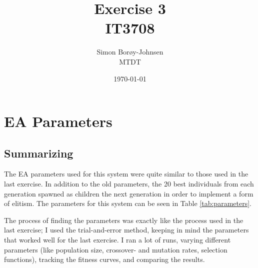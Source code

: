 \documentclass[
]{article}
\begin{document}
\title{\textbf{Exercise 3} \\ IT3708}
\author{Simon Borøy-Johnsen \\ MTDT}
\date{\today}
\maketitle


\section{EA Parameters}
\subsection{Summarizing}
The EA parameters used for this system were quite similar to those used in the last exercise. In addition to the old parameters, the 20 best individuals from each generation spawned as children the next generation in order to implement a form of elitism. The parameters for this system can be seen in Table \ref{tab:parameters}.

The process of finding the parameters was exactly like the process used in the last exercise; I used the trial-and-error method, keeping in mind the parameters that worked well for the last exercise. I ran a lot of runs, varying different parameters (like population size, crossover- and mutation rates, selection functions), tracking the fitness curves, and comparing the results.
\end{document}
